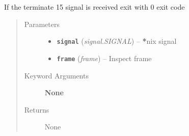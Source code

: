 \documentclass[letterpaper,10pt,english]{sphinxmanual}
\begin{document}

\begin{fulllineitems}
\label{run:run.__exitClean}
If the terminate 15 signal is received exit with 0 exit code
\begin{quote}\begin{description}
\item[{Parameters}] \leavevmode\begin{itemize}
\item {} 
\textbf{\texttt{signal}} (\emph{signal.SIGNAL}) -- {\color{red}\bfseries{}*}nix signal

\item {} 
\textbf{\texttt{frame}} (\emph{frame}) -- Inspect frame

\end{itemize}

\item[{Keyword Arguments}] \leavevmode
\textbf{None}

\item[{Returns}] \leavevmode
None

\end{description}\end{quote}

\end{fulllineitems}

\end{document}
